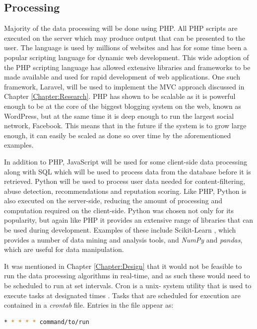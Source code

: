 \subsection{Processing}
Majority of the data processing will be done using PHP. All PHP scripts are executed on the server which may produce output that can be presented to the user. The language is used by millions of websites and has for some time been  a popular scripting language for dynamic web development. This wide adoption of the PHP scripting language has allowed extensive libraries and frameworks to be made available and used for rapid development of web applications. One such framework, Laravel, will be used to implement the MVC approach discussed in Chapter \ref{Chapter:Research}. PHP has shown to be scalable as it is powerful enough to be at the core of the biggest blogging system on the web, known as WordPress, but at the same time it is deep enough to run the largest social network, Facebook\cite{W3Schools:PHP_Intro, Wiki:WordPress, Fastcompany:Facebook_PHP}. This means that in the future if the system is to grow large enough, it can easily be scaled as done so over time by the aforementioned examples. 

In addition to PHP, JavaScript will be used for some client-side data processing along with SQL which will be used to process data from the database before it is retrieved. Python will be used to process user data needed for content-filtering, abuse detection, recommendations and reputation scoring. Like PHP, Python is also executed on the server-side, reducing the amount of processing and computation required on the client-side. Python was chosen not only for its popularity, but again like PHP it provides an extensive range of libraries that can be used during development. Examples of these include Scikit-Learn \cite{scikit:home}, which provides a number of data mining and analysis tools, and \emph{NumPy} and \emph{pandas}, which are useful for data manipulation.

It was mentioned in Chapter \ref{Chapter:Design} that it would not be feasible to run the data processing algorithms in real-time, and as such these would need to be scheduled to run at set intervals. Cron is a unix- system utility that is used to execute tasks at designated times \cite{Ubuntu:Cron}. Tasks that are scheduled for execution are contained in a \textit{crontab} file. Entries in the file appear as:
\begin{lstlisting}[language=bash]
* * * * * command/to/run
\end{lstlisting}

